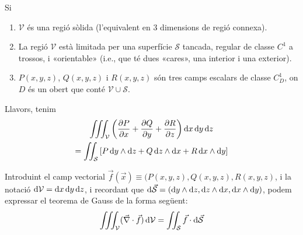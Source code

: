 \begin{thm}[de Gauss]\label{thm:gauss}
	Si
	\begin{enumerate}
		\item $\mathcal{V}$ és una regió sòlida (l'equivalent en 3 dimensions de regió connexa).
		\item  La regió $\mathcal{V}$ està limitada per una superfície $\mathcal{S}$ tancada, regular de classe $C^{1}$ a trossos, i «orientable» (i.e., que té dues «cares», una interior i una exterior).
		\item $P(x,y,z)$, $Q(x,y,z)$ i $R(x,y,z)$ són tres camps escalars de classe $C^{1}_{D}$, on $D$ és un obert que conté $\mathcal{V} \cup \mathcal{S}$.
	\end{enumerate}
	Llavors, tenim
	\begin{align}
	\begin{gathered}
		\iiint_{\mathcal{V}} \left( \frac{\partial P}{\partial x} + \frac{\partial Q}{\partial y} + \frac{\partial R}{\partial z} \right) \mathop{}\!\mathrm{d} x \mathop{}\!\mathrm{d} y \mathop{}\!\mathrm{d} z \\
		= \iint_{\mathcal{S}} \left[ P \mathop{}\!\mathrm{d} y \wedge \mathrm{d} z + Q \mathop{}\!\mathrm{d} z \wedge \mathrm{d} x + R \mathop{}\!\mathrm{d} x \wedge \mathrm{d} y \right]
	\end{gathered}
	\end{align}
\end{thm}
Introduint el camp vectorial $\vec{f}(\vec{x}) \equiv (P(x,y,z), Q(x,y,z), R(x,y,z)$, i la notació $\mathrm{d} \mathcal{V} = \mathrm{d} x \mathop{}\!\mathrm{d} y \mathop{}\!\mathrm{d} z$, i recordant que $\mathrm{d} \vec{\mathcal{S}} = (\mathrm{d} y \wedge \mathrm{d} z , \mathrm{d} z \wedge \mathrm{d} x, \mathrm{d} x \wedge \mathrm{d} y)$, podem expressar el teorema de Gauss de la forma següent:
\begin{align}
	\iiint_{\mathcal{V}} (\vec{\nabla} \cdot \vec{f}) \mathop{}\!\mathrm{d} \mathcal{V} = \iint_{\mathcal{S}} \vec{f} \cdot \mathrm{d} \vec{\mathcal{S}}
\end{align}
